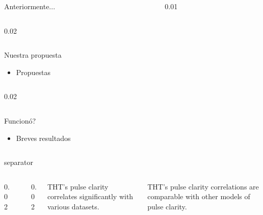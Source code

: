 \documentclass[final]{beamer}
\newlength{\sepwidth}
\newcommand{\separatorcolumn}[1][\sepwidth]{\begin{column}{#1}\end{column}}
\begin{document}
\begin{frame}[t]
\begin{columns}[T]
\begin{column}{0.94\textwidth}
\begin{column}{0.30\textwidth}
\begin{largeblock}{Anteriormente...}
\begin{itemize}
            \end{itemize}
        \end{largeblock}
    \end{column}
    \separatorcolumn[0.02\textwidth]
    \begin{column}{0.30\textwidth}
        \begin{largeblock}{Nuestra propuesta}
            \begin{itemize}
            \setlength\itemsep{1.2em}
              \item Propuestas
            \end{itemize}
        \end{largeblock}
    \end{column}
    \separatorcolumn[0.02\textwidth]
    \begin{column}{0.30\textwidth}
        \begin{largeblock}{Funcionó?}
            \begin{itemize}
            \setlength\itemsep{1em}
            \item Breves resultados
           \end{itemize}
        \end{largeblock}
    \end{column}
    \end{column}
    \separatorcolumn[0.01\textwidth]
    \end{columns}

    \vspace{-1cm}
    \begin{beamercolorbox}[wd=\pagewidth]{separator}
    \vspace{6pt}
    \begin{columns}[T]
    \separatorcolumn[0.02\textwidth]
    \begin{column}{0.02\textwidth}
        \vspace{3.25cm}
        {\color{darkgray} \huge {}}
    \end{column}
    \separatorcolumn[0.02\textwidth]
    \begin{column}[t]{0.38\textwidth}
      THT's pulse clarity correlates significantly with various datasets.

      \vspace{0.7cm}
      \hspace{-0.5cm}%
    \end{column}
    \begin{column}[t]{0.24\textwidth}
      THT's pulse clarity correlations are comparable with other models of
      pulse clarity.


\end{column}
\end{columns}
\end{beamercolorbox}
\end{frame}
\end{document}
